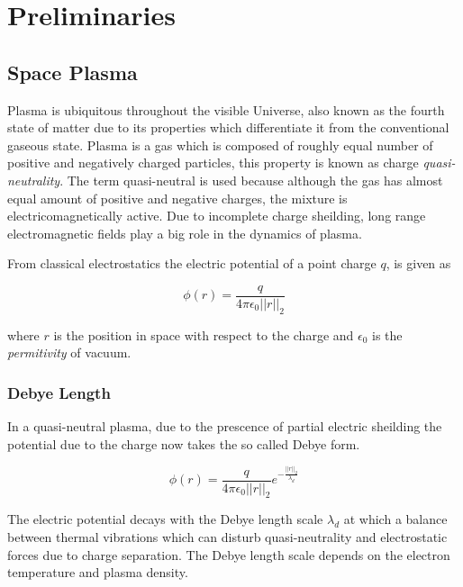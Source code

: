 \chapter{Preliminaries}\label{chapter:preliminaries}

\section{Space Plasma}\label{sec:plasma}

Plasma is ubiquitous throughout the visible Universe, also known as the fourth state of matter 
due to its properties which differentiate it from the conventional gaseous state. Plasma is a 
gas which is composed of roughly equal number of positive and negatively charged particles, this
property is known as charge \emph{quasi-neutrality}. The term quasi-neutral is used because although
the gas has almost equal amount of positive and negative charges, the mixture is electricomagnetically 
active. Due to incomplete charge sheilding, long range electromagnetic fields play a big role in the 
dynamics of plasma.

From classical electrostatics the electric potential of a point charge $q$, is given as

\begin{equation}
    \phi(r) = \frac{q}{4\pi\epsilon_0 ||r||_2}
\end{equation}

where $r$ is the position in space with respect to the charge and $\epsilon_0$ is the \emph{permitivity} of vacuum.

\subsection*{Debye Length}

In a quasi-neutral plasma, due to the prescence of partial electric sheilding the potential due to the charge 
now takes the so called Debye form.

\begin{equation}
    \phi(r) = \frac{q}{4\pi\epsilon_0 ||r||_2} e^{-\frac{||r||_2}{\lambda_d}}
\end{equation}

The electric potential decays with the Debye length scale $\lambda_d$ at which a balance between thermal vibrations 
which can disturb quasi-neutrality and electrostatic forces due to charge separation. The Debye length scale depends
on the electron temperature and plasma density.

